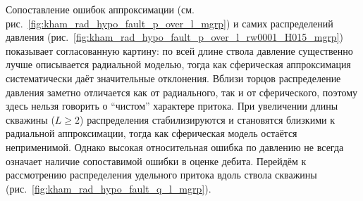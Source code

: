 \documentclass{article}
\begin{document}
Сопоставление ошибок аппроксимации (см. рис.~\ref{fig:kham_rad_hypo_fault_p_over_l_mgrp})
и самих распределений давления (рис.~\ref{fig:kham_rad_hypo_fault_p_over_l_rw0001_H015_mgrp})
показывает согласованную картину: по всей длине ствола давление существенно лучше
описывается радиальной моделью, тогда как сферическая аппроксимация систематически
даёт значительные отклонения. Вблизи торцов распределение давления заметно отличается
как от радиального, так и от сферического, поэтому здесь нельзя говорить о ``чистом''
характере притока. При увеличении длины скважины ($L \geq 2$) распределения стабилизируются
и становятся близкими к радиальной аппроксимации, тогда как сферическая модель остаётся
неприменимой. Однако высокая относительная ошибка по давлению не всегда означает наличие
сопоставимой ошибки в оценке дебита. Перейдём к рассмотрению распределения удельного притока вдоль
ствола скважины (рис.~\ref{fig:kham_rad_hypo_fault_q_l_mgrp}).
\end{document}
